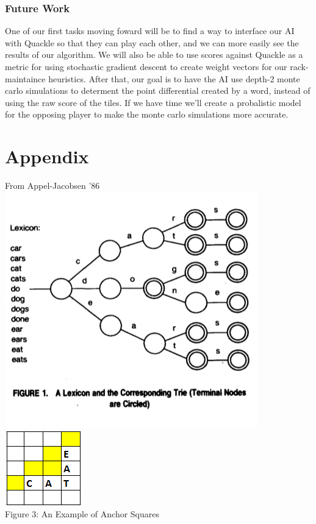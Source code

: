 \documentclass[12pt]{article}
\begin{document}
\subsubsection*{Future Work}
One of our first tasks moving foward will be to find a way to
interface our AI with Quackle so that they can play each other, and we
can more easily see the results of our algorithm. We will also be able
to use scores against Quackle as a metric for using stochastic
gradient descent to create weight vectors for our rack-maintaince
heuristics. After that, our goal is to have the AI use depth-2 monte
carlo simulations to determent the point differential created by a
word, instead of using the raw score of the tiles. If we have time
we'll create a probalistic model for the opposing player to make the
monte carlo simulations more accurate.
\section*{Appendix}
\begin{center}
  From Appel-Jacobsen '86\\
  \includegraphics[scale=0.6]{trie}\\
\includegraphics{anchorexample}\\
Figure 3: An Example of Anchor Squares
\end{center}
\end{document}
